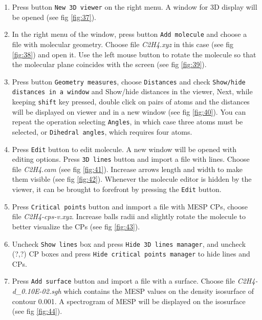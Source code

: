 \documentclass[a4paper,10pt]{article}
\begin{document}
\begin{enumerate}

\item  Press button \texttt{New 3D viewer} on the right menu. A window for 3D display
will be opened (see fig \ref{fig:37}). 

\item In the right menu of the window, press button \texttt{Add molecule} and
choose a file with molecular geometry. Choose file {\it C2H4.xyz} in this case 
(see fig \ref{fig:38}) and open it. Use the left mouse button to rotate the
molecule so that the molecular plane coincides with the screen (see fig \ref{fig:39}).

\item Press button \texttt{Geometry measures}, choose \texttt{Distances}
and check \texttt{Show/hide distances in a window} and
{Show/hide distances in the viewer}, Next, while keeping \texttt{shift} key pressed, double click on pairs of atoms
and the distances will be displayed on viewer and in a new window
(see fig \ref{fig:40}). You can repeat the operation selecting \texttt{Angles},
in which case three atoms must be selected, or \texttt{Dihedral angles},
which requires four atoms.

\item Press \texttt{Edit} button to edit molecule. A new window will be opened
with editing options. Press \texttt{3D lines} button and import a file
with lines. Choose file {\it C2H4.cam} (see fig \ref{fig:41}).
Increase arrows length and width to make them visible (see fig \ref{fig:42}).
Whenever the molecule editor is hidden by the viewer, it can be 
brought to forefront by pressing the \texttt{Edit} button.

\item Press \texttt{Critical points} button and inmport a file with
MESP CPs, choose file {\it C2H4-cps-v.xyz}. Increase balls radii 
and slightly rotate the molecule to better visualize the CPs
(see fig \ref{fig:43}).

\item Uncheck \texttt{Show lines} box and press \texttt{Hide 3D lines manager},
and uncheck (?,?) CP boxes and press \texttt{Hide critical points manager}
to hide lines and CPs.

\item Press \texttt{Add surface} button and import a file with a surface.
Choose file {\it C2H4-d\_0.10E-02.sgh} which contains the MESP
values on the density isosurface of contour 0.001. A spectrogram of MESP 
will be displayed on the isosurface (see fig \ref{fig:44}).


\end{enumerate}
\end{document}
